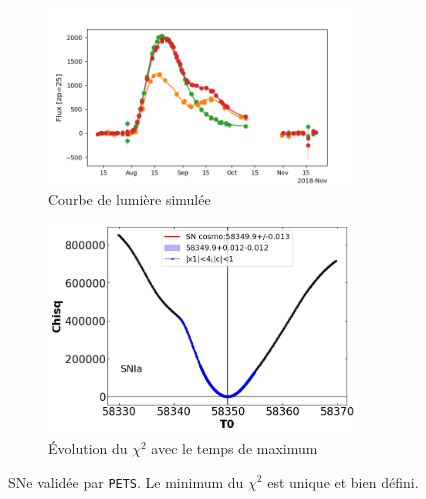 \documentclass{book}
\def\pets{\texttt{PETS}\xspace}
\begin{document}
\begin{figure}
	\begin{subfigure}{0.45\textwidth}
		\centering
		\includegraphics[width=0.9\textwidth]{figures/276_lc_truth.png}
		\caption{Courbe de lumière simulée}
	\end{subfigure}
	\hfill
	\begin{subfigure}{0.45\textwidth}
		\centering
		\includegraphics[width=0.9\textwidth]{figures/276_Tmaxgrid.png}
		\caption{Évolution du $\chi^2$ avec le temps de maximum}
	\end{subfigure}
	\caption{SNe validée par \pets. Le minimum du $\chi^2$ est unique et bien défini.}
	\label{fig:pets_good}
\end{figure}
\end{document}
